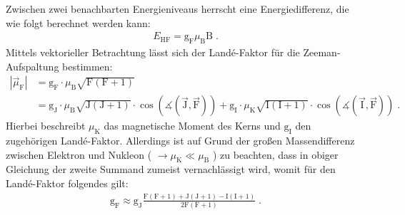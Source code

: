 \FloatBarrier
Zwischen zwei benachbarten Energieniveaus herrscht eine Energiedifferenz, die wie folgt berechnet werden kann:
\begin{align*}
    E_{\text{HF}} = \text{g}_{\text{F}} \mu_{\text{B}} \text{B} \; .
\end{align*}
Mittels vektorieller Betrachtung lässt sich der Landé-Faktor für die Zeeman-Aufspaltung bestimmen:
\begin{align*}
    |\vec{\mu}_{\text{F}}| &= \text{g}_{\text{F}} \cdot \mu_{\text{B}} \sqrt{\text{F} (\text{F}+1)} \\
    &=\text{g}_{\text{J}} \cdot \mu_{\text{B}} \sqrt{\text{J} (\text{J} + 1)} \cdot \cos\left(\measuredangle(\vec{\text{J}},\vec{\text{F}})\right) +
    \text{g}_{\text{I}} \cdot \mu_{\text{K}} \sqrt{ \text{I}(\text{I}+1) } \cdot \cos\left(\measuredangle(\vec{\text{I}},\vec{\text{F}})\right) \; .
\end{align*}
Hierbei beschreibt $\mu_{\text{K}}$ das magnetische Moment des Kerns und $\text{g}_{\text{I}}$ den zugehörigen Landé-Faktor.
Allerdings ist auf Grund der großen Massendifferenz zwischen Elektron und Nukleon ( $\rightarrow \mu_{\text{K}} \ll \mu_{\text{B}} $ ) zu beachten, dass in obiger Gleichung der zweite Summand zumeist vernachlässigt wird, womit für den Landé-Faktor folgendes gilt:
\begin{align*}
    \text{g}_{\text{F}} \approx \text{g}_{\text{J}} \frac{\text{F} (\text{F} + 1)+\text{J} (\text{J} + 1) - \text{I}(\text{I} + 1)}{2\text{F}(\text{F}+1)} \; .
	\label{eq:La-Fa.gf}
\end{align*}

